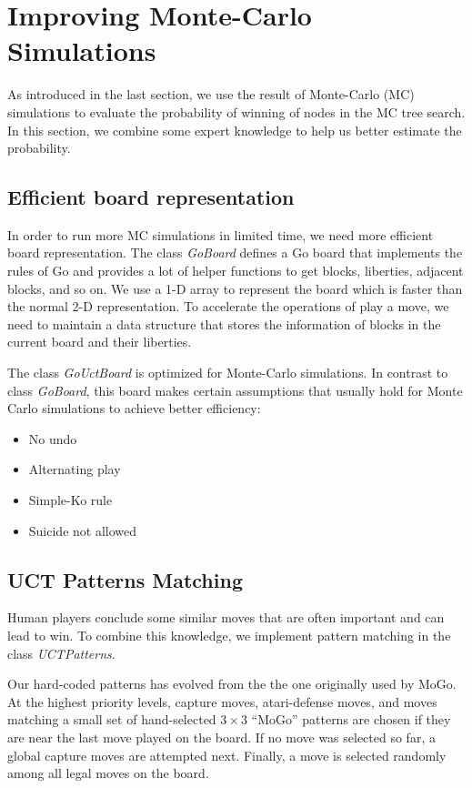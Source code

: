 
\section{Improving Monte-Carlo Simulations}

As introduced in the last section, we use the result of Monte-Carlo (MC) simulations to evaluate the probability of winning of nodes in the MC tree search. In this section, we combine some expert knowledge to help us better estimate the probability.

\subsection{Efficient board representation}

In order to run more MC simulations in limited time, we need more efficient board representation. The class \emph{GoBoard} defines a Go board that implements the rules of Go and provides a lot of helper functions to get blocks, liberties, adjacent blocks, and so on. We use a 1-D array to represent the board which is faster than the normal 2-D representation. To accelerate the operations of play a move, we need to maintain a data structure that stores the information of blocks in the current board and their liberties.

The class \emph{GoUctBoard} is optimized for Monte-Carlo simulations. In contrast to class \emph{GoBoard}, this board makes certain assumptions that usually hold for Monte Carlo simulations to achieve better efficiency:
\begin{itemize}
  \item No undo
  \item Alternating play
  \item Simple-Ko rule
  \item Suicide not allowed
\end{itemize}

\subsection{UCT Patterns Matching}

Human players conclude some similar moves that are often important and can lead to win. To combine this knowledge, we implement pattern matching in the class \emph{UCTPatterns}.

Our hard-coded patterns has evolved from the the one originally used by MoGo\cite{gelly2007contribution}. At the highest priority levels, capture moves, atari-defense moves, and moves matching a small set of hand-selected $3 \times 3$ ``MoGo'' patterns are chosen if they are near the last move played on the board. If no move was selected so far, a global capture moves are attempted next. Finally, a move is selected randomly among all legal moves on the board.

